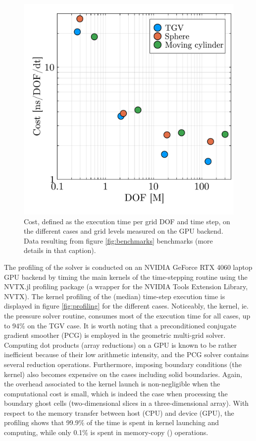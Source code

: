 \documentclass[final,3p,times]{elsarticle}
\begin{document}
\begin{figure}[!t]
  \centering
  \includegraphics[width=0.4\linewidth]{img/cost.pdf}
  \vspace*{-0.2cm}
  \caption{Cost, defined as the execution time per grid DOF and time step, on the different cases and grid levels measured on the GPU backend. Data resulting from figure \ref{fig:benchmarks} benchmarks (more details in that caption).}
\label{fig:cost}
\end{figure}

The profiling of the solver is conducted on an NVIDIA GeForce RTX 4060 laptop GPU backend by timing the main kernels of the time-stepping routine using the NVTX.jl profiling package \citep{Byrne2023} (a wrapper for the NVIDIA Tools Extension Library, NVTX). The kernel profiling of the (median) time-step execution time is displayed in figure \ref{fig:profiling} for the different cases. Noticeably, the  kernel, ie. the pressure solver routine, consumes most of the execution time for all cases, up to 94\% on the TGV case. It is worth noting that a preconditioned conjugate gradient smoother (PCG) is employed in the geometric multi-grid solver. Computing dot products (array reductions) on a GPU is known to be rather inefficient because of their low arithmetic intensity, and the PCG solver contains several reduction operations. Furthermore, imposing boundary conditions (the  kernel) also becomes expensive on the cases including solid boundaries. Again, the overhead associated to the kernel launch is non-negligible when the computational cost is small, which is indeed the case when processing the boundary ghost cells (two-dimensional slices in a three-dimensional array). With respect to the memory transfer between host (CPU) and device (GPU), the profiling shows that 99.9\% of the time is spent in kernel launching and computing, while only 0.1\% is spent in memory-copy () operations.
\end{document}

